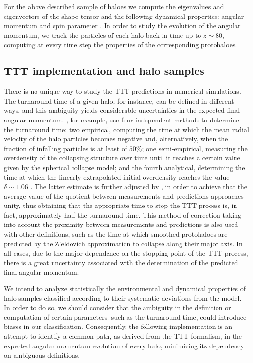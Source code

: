 \documentclass[fleqn,usenatbib]{mnras}
\begin{document}
For the above described sample of haloes we compute the eigenvalues and eigenvectors of the shape tensor \citep{pazetal2006} and the following dynamical properties: angular momentum and spin parameter \citep{bullocketal2001}. In order to study the evolution of the angular momentum, we track the particles of each halo back in time up to $z \sim 80$, computing at every time step the properties of the corresponding protohaloes.

\subsection{TTT implementation and halo samples}
\label{ttt_implementation}
There is no unique way to study the TTT predictions in numerical simulations. The turnaround time of a given halo, for instance, can be defined in different ways, and this ambiguity yields considerable uncertainties in the expected final angular momentum. \citet{sugermanetal2000}, for example, use four independent methods to determine the turnaround time: two empirical, computing the time at which the mean radial velocity of the halo particles becomes negative and, alternatively, when the fraction of infalling particles is at least of $50\%$; one semi-empirical, measuring the overdensity of the collapsing structure over time until it reaches a certain value given by the spherical collapse model; and the fourth analytical, determining the time at which the linearly extrapolated initial overdensity reaches the value $\delta\sim 1.06$ \citep{peebles1980}. The latter estimate is further adjusted by \citet{porcianietal2002a}, in order to achieve that the average value of the quotient between measurements and predictions approaches unity, thus obtaining that the appropriate time to stop the TTT process is, in fact, approximately half the turnaround time. This method of correction taking into account the proximity between measurements and predictions is also used with other definitions, such as the time at which smoothed protohaloes are predicted by the Z'eldovich approximation to collapse along their major axis. In all cases, due to the major dependence on the stopping point of the TTT process, there is a great uncertainty associated with the determination of the predicted final angular momentum.

We intend to analyze statistically the environmental and dynamical properties of halo samples classified according to their systematic deviations from the model. In order to do so, we should consider that the ambiguity in the definition or computation of certain parameters, such as the turnaround time, could introduce biases in our classification. Consequently, the following implementation is an attempt to identify a common path, as derived from the TTT formalism, in the expected angular momentum evolution of every halo, minimizing its dependency on ambiguous definitions.
\end{document}
